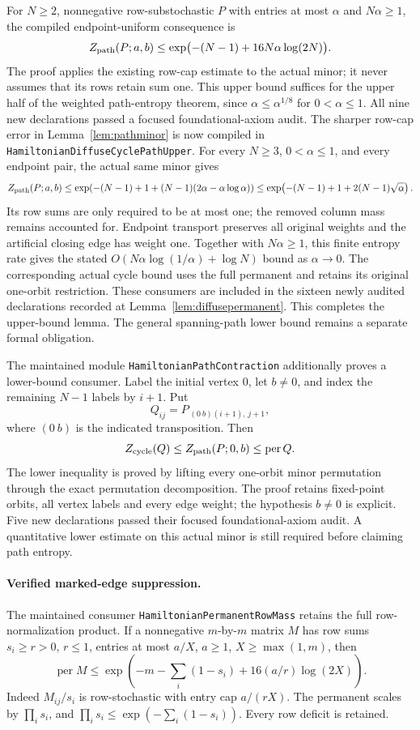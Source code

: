 For \(N\geq2\), nonnegative row-substochastic \(P\) with entries at most
\(\alpha\) and \(N\alpha\geq1\), the compiled endpoint-uniform consequence is
\[
 Z_{\rm path}(P;a,b)
       \leq \exp\bigl(-(N-1)+16N\alpha\log(2N)\bigr).
\]
The proof applies the existing row-cap estimate to the actual minor;
it never assumes that its rows retain sum one.
This upper bound suffices for the upper half of the weighted path-entropy
theorem, since \(\alpha\leq\alpha^{1/8}\) for \(0<\alpha\leq1\).
All nine new declarations passed a focused foundational-axiom audit.
The sharper row-cap error in Lemma~\ref{lem:pathminor} is now
compiled in \texttt{HamiltonianDiffuseCyclePathUpper}.
For every \(N\geq3\), \(0<\alpha\leq1\), and every endpoint pair,
the actual same minor gives
\[
 Z_{\rm path}(P;a,b)\leq
 \exp\!\left(-(N-1)+1+
       (N-1)(2\alpha-\alpha\log\alpha)\right)
 \leq\exp\!\left(-(N-1)+1+2(N-1)\sqrt{\alpha}\right).
\]
Its row sums are only required to be at most one; the removed
column mass remains accounted for. Endpoint transport preserves
all original weights and the artificial closing edge has weight one.
Together with \(N\alpha\geq1\), this finite entropy rate gives the
stated \(O(N\alpha\log(1/\alpha)+\log N)\) bound as \(\alpha\to0\).
The corresponding actual cycle bound uses the full permanent and
retains its original one-orbit restriction.
These consumers are included in the sixteen newly audited
declarations recorded at Lemma~\ref{lem:diffusepermanent}.
This completes the upper-bound lemma. The general spanning-path
lower bound remains a separate formal obligation.

The maintained module \texttt{HamiltonianPathContraction} additionally
proves a lower-bound consumer. Label the initial vertex \(0\), let
\(b\ne0\), and index the remaining \(N-1\) labels by \(i+1\). Put
\[
 Q_{ij}=P_{\,(0\ b)(i+1),\,j+1},
\]
where \((0\ b)\) is the indicated transposition.
Then
\[
 Z_{\rm cycle}(Q)\leq Z_{\rm path}(P;0,b)
                         \leq\operatorname{per}Q.
\]
The lower inequality is proved by lifting every one-orbit minor
permutation through the exact permutation decomposition. The proof
retains fixed-point orbits, all vertex labels and every edge weight;
the hypothesis \(b\ne0\) is explicit. Five new declarations passed
their focused foundational-axiom audit. A quantitative lower estimate
on this actual minor is still required before claiming path entropy.

\paragraph{Verified marked-edge suppression.}
The maintained consumer \texttt{HamiltonianPermanentRowMass}
retains the full row-normalization product. If a nonnegative
\(m\)-by-\(m\) matrix \(M\) has row sums \(s_i\geq r>0\),
\(r\leq1\), entries at most \(a/X\), \(a\geq1\), \(X\geq\max(1,m)\), then
\[
 \operatorname{per}M
 \leq\exp\!\left(-m-\sum_i(1-s_i)
                   +16(a/r)\log(2X)\right).
\]
Indeed \(M_{ij}/s_i\) is row-stochastic with entry cap
\(a/(rX)\). The permanent scales by \(\prod_i s_i\), and
\(\prod_i s_i\leq\exp(-\sum_i(1-s_i))\).
Every row deficit is retained.

